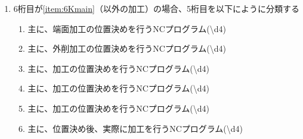 \begin{enumerate}[label=\alph*)]
\item 6桁目が\ref{item:6Kmain}（\Dimple 以外の加工）の場合、5桁目を以下にように分類する
  \begin{enumerate}[label=\arabic*., ref=\arabic*, start=1]
  \item%
    主に、端面加工の位置決めを行うNCプログラム({\textbackslash d{4}})
  \item\label{item:5KO} 主に、外削加工の位置決めを行うNCプログラム({\textbackslash d{4}})
  \item%
    主に、\nameKeyway 加工の位置決めを行うNCプログラム({\textbackslash d{4}})
  \item%
    主に、\nameEndFaceOutChamfer 加工の位置決めを行うNCプログラム({\textbackslash d{4}})
  \item%
    主に、\EndFaceInChamfer 加工の位置決めを行うNCプログラム({\textbackslash d{4}})
  \setcounter{enumii}{8}
  \item 主に、位置決め後、実際に加工を行うNCプログラム({\textbackslash d{4}})
  \end{enumerate}
\end{enumerate}



